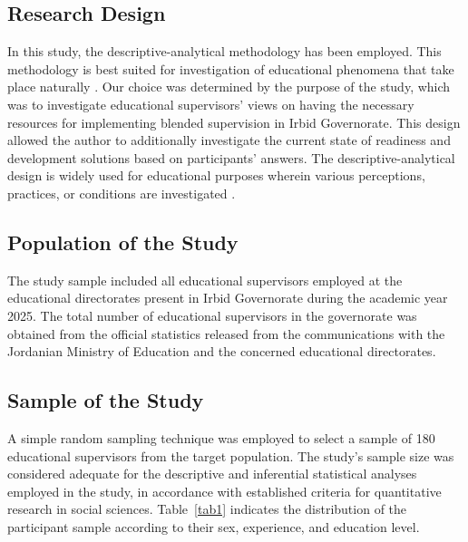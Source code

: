 \documentclass[10pt]{NSP1}
\begin{document}
\subsection{Research Design}

In this study, the descriptive-analytical methodology has been employed. This methodology is best suited for investigation of educational phenomena that take place naturally \cite{ref31}. Our choice was determined by the purpose of the study, which was to investigate educational supervisors' views on having the necessary resources for implementing blended supervision in Irbid Governorate. This design allowed the author to additionally investigate the current state of readiness and development solutions based on participants' answers. The descriptive-analytical design is widely used for educational purposes wherein various perceptions, practices, or conditions are investigated \cite{ref32}.

\subsection{Population of the Study}

The study sample included all educational supervisors employed at the educational directorates present in Irbid Governorate during the academic year 2025. The total number of educational supervisors in the governorate was obtained from the official statistics released from the communications with the Jordanian Ministry of Education and the concerned educational directorates.

\subsection{Sample of the Study}

A simple random sampling technique was employed to select a sample of 180 educational supervisors from the target population. The study's sample size was considered adequate for the descriptive and inferential statistical analyses employed in the study, in accordance with established criteria for quantitative research in social sciences. Table~\ref{tab1} indicates the distribution of the participant sample according to their sex, experience, and education level.
\end{document}
